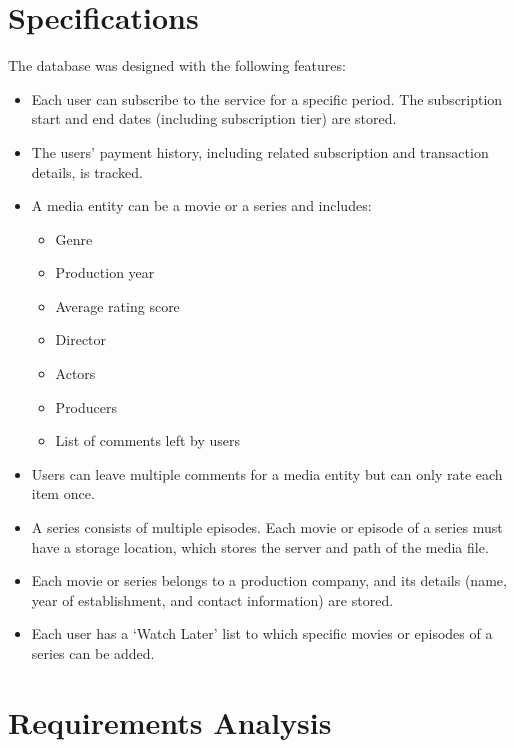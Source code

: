 \documentclass[13pt]{article}
\begin{document}
\section{Specifications}
The database was designed with the following features:
\begin{itemize}
    \item Each user can subscribe to the service for a specific period. The subscription start and end dates (including subscription tier) are stored.
    \item The users' payment history, including related subscription and transaction details, is tracked.
    \item A media entity can be a movie or a series and includes:
    \begin{itemize}
        \item Genre
        \item Production year
        \item Average rating score
        \item Director
        \item Actors
        \item Producers
        \item List of comments left by users
    \end{itemize}
    \item Users can leave multiple comments for a media entity but can only rate each item once.
    \item A series consists of multiple episodes. Each movie or episode of a series must have a storage location, which stores the server and path of the media file.
    \item Each movie or series belongs to a production company, and its details (name, year of establishment, and contact information) are stored.
    \item Each user has a ‘Watch Later’ list to which specific movies or episodes of a series can be added.
\end{itemize}

\section{Requirements Analysis}
\end{document}
